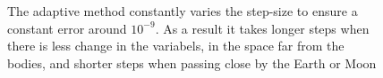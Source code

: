 \begin{figure}
{        }
        \caption{The adaptive method constantly varies the step-size to ensure a constant error around $10^{-9}$. As a result it takes longer steps when there is less change in the variabels, in the space far from the bodies, and shorter steps when passing close by the Earth or Moon}
        \label{fig:adaptive-step_error}
\end{figure}

\begin{figure}
    \centering
\end{figure}
